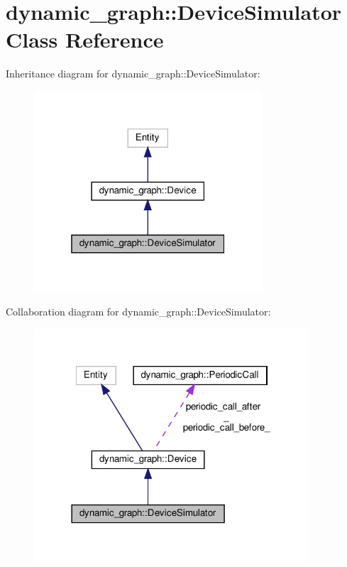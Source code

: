 \hypertarget{classdynamic__graph_1_1DeviceSimulator}{}\section{dynamic\+\_\+graph\+:\+:Device\+Simulator Class Reference}
\label{classdynamic__graph_1_1DeviceSimulator}


Inheritance diagram for dynamic\+\_\+graph\+:\+:Device\+Simulator\+:
\nopagebreak
\begin{figure}[H]
\begin{center}
\leavevmode
\includegraphics[width=241pt]{classdynamic__graph_1_1DeviceSimulator__inherit__graph}
\end{center}
\end{figure}


Collaboration diagram for dynamic\+\_\+graph\+:\+:Device\+Simulator\+:
\nopagebreak
\begin{figure}[H]
\begin{center}
\leavevmode
\includegraphics[width=290pt]{classdynamic__graph_1_1DeviceSimulator__coll__graph}
\end{center}
\end{figure}
